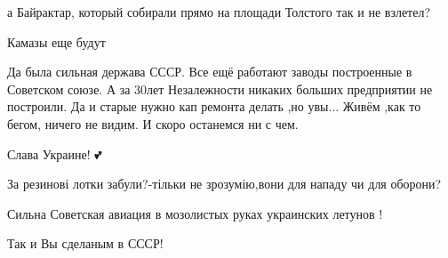 \begin{itemize}
а Байрактар, который собирали прямо на площади Толстого так и не взлетел?

 
Камазы еще будут

 

Да была сильная держава СССР. Все ещё работают заводы построенные в Советском
союзе. А за 30лет Незалежности никаких больших предприятии не построили. Да и
старые нужно кап ремонта делать ,но увы... Живём ,как то бегом, ничего не
видим. И скоро останемся ни с чем.


 
Слава Украине! 💕

 
За резинові лотки забули?-тільки не зрозумію,вони для нападу чи для оборони?

 
Сильна Советская авиация в мозолистых руках украинских летунов !

 
Так и Вы сделаным в СССР!


\end{itemize}
